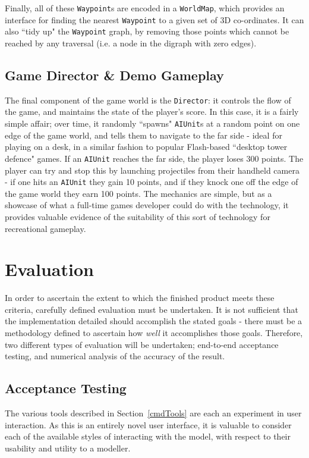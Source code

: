 \documentclass[a4paper,10pt]{report}
\begin{document}
Finally, all of these \texttt{Waypoint}s are encoded in a \texttt{WorldMap}, which provides an interface for finding the nearest \texttt{Waypoint} to a given set of 3D co-ordinates. It can also ``tidy up" the \texttt{Waypoint} graph, by removing those points which cannot be reached by any traversal (i.e. a node in the digraph with zero edges).

\section{Game Director \& Demo Gameplay}
The final component of the game world is the \texttt{Director}: it controls the flow of the game, and maintains the state of the player's score. In this case, it is a fairly simple affair; over time, it randomly ``spawns" \texttt{AIUnit}s at a random point on one edge of the game world, and tells them to navigate to the far side - ideal for playing on a desk, in a similar fashion to popular Flash-based ``desktop tower defence" games. If an \texttt{AIUnit} reaches the far side, the player loses 300 points. The player can try and stop this by launching projectiles from their handheld camera - if one hits an \texttt{AIUnit} they gain 10 points, and if they knock one off the edge of the game world they earn 100 points. The mechanics are simple, but as a showcase of what a full-time games developer could do with the technology, it provides valuable evidence of the suitability of this sort of technology for recreational gameplay.

\clearpage

\chapter{Evaluation}
In order to ascertain the extent to which the finished product meets these criteria, carefully defined evaluation must be undertaken. It is not sufficient that the implementation detailed should accomplish the stated goals - there must be a methodology defined to ascertain how \textit{well} it accomplishes those goals. Therefore, two different types of evaluation will be undertaken; end-to-end acceptance testing, and numerical analysis of the accuracy of the result.

\section{Acceptance Testing}
The various tools described in Section~\ref{cmdTools} are each an experiment in user interaction. As this is an entirely novel user interface, it is valuable to consider each of the available styles of interacting with the model, with respect to their usability and utility to a modeller.
\end{document}
